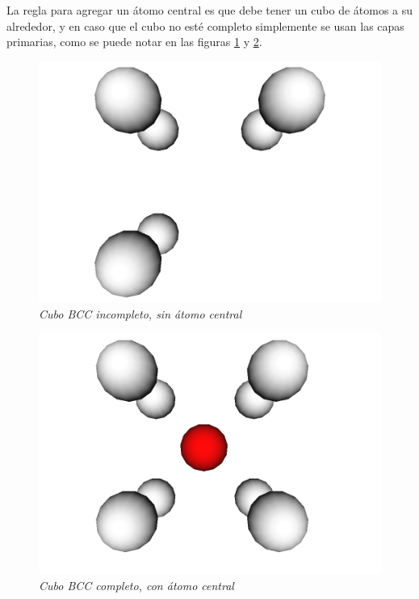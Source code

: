 La regla para agregar un átomo central es que debe tener un cubo de átomos a su alrededor, y en caso que el cubo no esté completo simplemente se usan las capas primarias, como se puede notar en las figuras \ref{BCC-incomplete-molecule} y \ref{BCC-complete-molecule}.

\begin{figure}[ht]
  \centering
  \includegraphics[scale=.3]{images/BCC-incomplete-molecule}
  \caption{\em Cubo BCC incompleto, sin átomo central}
  \label{BCC-incomplete-molecule}
\end{figure}

\begin{figure}[ht]
  \centering
  \includegraphics[scale=.3]{images/BCC-complete-molecule}
  \caption{\em Cubo BCC completo, con átomo central}
  \label{BCC-complete-molecule}
\end{figure}

